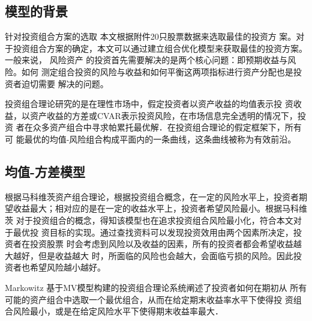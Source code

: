 \documentclass[withoutpreface,bwprint]{cumcmthesis} %
\begin{document}
	\subsection{模型的背景}
	针对投资组合方案的选取 本文根据附件20只股票数据来选取最佳的投资方
案。对于投资组合方案的确定，本文可以通过建立组合优化模型来获取最佳的投资方案。
一般来说， 风险资产 的投资首先需要解决的是两个核心问题：即预期收益与风 险。如何
测定组合投资的风险与收益和如何平衡这两项指标进行资产分配也是投资者迫切需要
解决的问题。

投资组合理论研究的是在理性市场中，假定投资者以资产收益的均值表示投
资收益，以资产收益的方差或CVAR表示投资风险，在市场信息完全透明的情况下，投资
者在众多资产组合中寻求帕累托最优解．在投资组合理论的假定框架下，所有可
能最优的均值-风险组合构成平面内的一条曲线，这条曲线被称为有效前沿。
	\subsection{均值-方差模型}
根据马科维茨资产组合理论，根据投资组合概念，在一定的风险水平上，投资者期
望收益最大；相对应的是在一定的收益水平上，投资者希望风险最小。根据马科维茨
对于投资组合的概念，得知该模型也在追求投资组合风险最小化，符合本文对于最优投
资目标的实现。通过查找资料可以发现投资效用由两个因素所决定，投资者在投资股票
时会考虑到风险以及收益的因素，所有的投资者都会希望收益越大越好，但是收益越大
时，所面临的风险也会越大，会面临亏损的风险。因此投资者也希望风险越小越好。


	Markowitz 基于MV模型构建的投资组合理论系统阐述了投资者如何在期初从
所有可能的资产组合中选取一个最优组合，从而在给定期末收益率水平下使得投
资组合风险最小，或是在给定风险水平下使得期末收益率最大．
\end{document}
